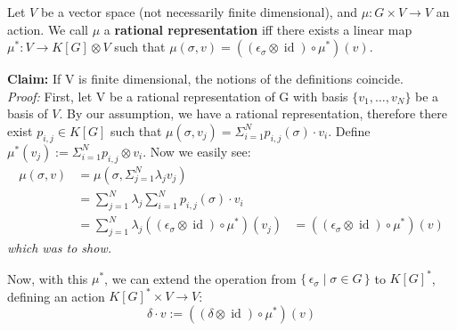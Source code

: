 \smallskip
\begin{definition}
  Let $V$ be a vector space (not necessarily finite dimensional), and $ \mu : G \times V \longrightarrow V $ an action.
  We call $ \mu $ a \textbf{rational representation} iff there exists a linear map $ \mu^\ast : V \longrightarrow K[G] \otimes V $ such that $ \mu \left( \sigma , v \right) = \left( \left( \epsilon_\sigma \otimes \operatorname{id} \right) \circ \mu^\ast \right) \left(v\right) $. 
\end{definition}
\textbf{Claim:} If V is finite dimensional, the notions of the definitions coincide.\\
\textit{Proof:} First, let V be a rational representation of G with basis $\{ v_1 , \ldots , v_N \}$ be a basis of $V$.
By our assumption, we have a rational representation, therefore there exist $p_{i,j} \in K \left\lbrack G \right\rbrack$ such that $\mu\left( \sigma, v_j \right) = \Sigma_{i=1}^{N} p_{i,j}\left(\sigma\right) \cdot v_i$.
Define $\mu^\ast \left( v_j \right) := \Sigma_{i=1}^{N} p_{i,j} \otimes v_i$.
Now we easily see:
\begin{equation}
  \begin{aligned}
    \mu\left(\sigma,v\right)
    &= \mu \left(\sigma, \Sigma_{j=1}^N \lambda_j v_j \right) \\
    &= \sum_{j=1}^N \lambda_j  \sum_{i=1}^N p_{i,j}\left(\sigma\right) \cdot v_i \\
    &= \sum_{j=1}^N \lambda_j \left(\left(\epsilon_\sigma \otimes \operatorname{id} \right) \circ \mu^\ast \right) \left(v_j \right)
    &= \left(\left(\epsilon_\sigma \otimes \operatorname{id} \right) \circ \mu^\ast \right) \left(v \right)
  \end{aligned}
\end{equation}
\textit{which was to show.}

\smallskip
Now, with this $\mu^\ast$, we can extend the operation from $\{\, \epsilon_\sigma \mid \sigma \in G \, \} $ to $K \left\lbrack G \right\rbrack^\ast$, defining an action $K \left\lbrack G \right\rbrack^\ast \times V \longrightarrow V$:
\begin{equation}
  \delta \cdot v := \left(\left( \delta \otimes \operatorname{id} \right) \circ \mu^\ast \right) \left(v\right)
\end{equation}
